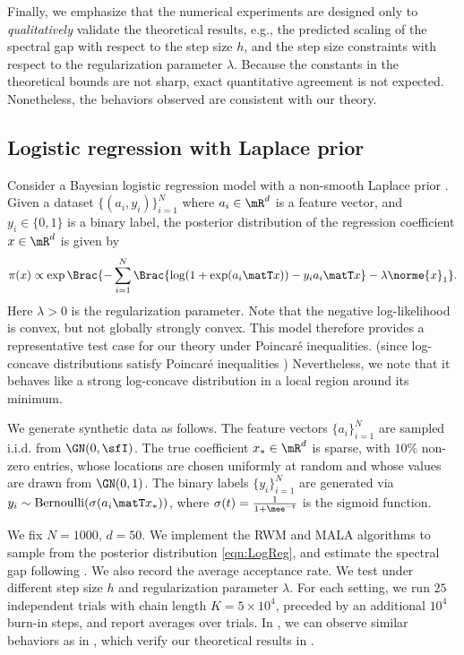 \documentclass[11pt]{article}
\begin{document}
Finally, we emphasize that the numerical experiments are designed only to \emph{qualitatively} validate the theoretical results, e.g., the predicted scaling of the spectral gap with respect to the step size $h$, and the step size constraints with respect to the regularization parameter $\lambda$.
Because the constants in the theoretical bounds are not sharp, exact quantitative agreement is not expected. Nonetheless, the behaviors observed are consistent with our theory.



\subsection{Logistic regression with Laplace prior}
\label{sec:Num_LogReg}
%
Consider a Bayesian logistic regression model with a non-smooth Laplace prior \citep{MR2227368,MR2370074}.
Given a dataset $\{(a_i,y_i)\}_{i=1}^N$ where $a_i \in \mR^d$ is a feature vector, and $y_i \in \{0,1\}$ is a binary label, the posterior distribution of the regression coefficient $x \in \mR^d$ is given by
\begin{equation}
\label{eqn:LogReg}
    \pi(x) \propto \exp \Brac{ - \sum_{i=1}^N \Brac{ \log ( 1 + \exp (a_i\matT x) ) - y_i a_i\matT x } - \lambda \norme{x}_1 }.
\end{equation}
Here $\lambda>0$ is the regularization parameter.
Note that the negative log-likelihood is convex, but not globally strongly convex. This model therefore provides a representative test case for our theory under Poincar\'e inequalities.
(since log-concave distributions satisfy Poincar\'e inequalities \citep{MR2507637})
Nevertheless, we note that it behaves like a strong log-concave distribution in a local region around its minimum.


We generate synthetic data as follows.
The feature vectors $\{a_i\}_{i=1}^N$ are sampled i.i.d. from $\GN(0,\sfI)$.
%
The true coefficient $x_* \in \mR^d$ is sparse, with $10\%$ non-zero entries, whose locations are chosen uniformly at random and whose values are drawn from $\GN(0,1)$.
%
The binary labels $\{y_i\}_{i=1}^N$ are generated via $y_i \sim \text{Bernoulli}(\sigma(a_i\matT x_*))$, where $\sigma(t) = \frac{1}{1+\mee^{-t}}$ is the sigmoid function.



We fix $N=1000$, $d=50$.
We implement the RWM and MALA algorithms to sample from the posterior distribution \eqref{eqn:LogReg}, and estimate the spectral gap following .
We also record the average acceptance rate.
We test under different step size $h$ and regularization parameter $\lambda$.
For each setting, we run $25$ independent trials with chain length $K = 5\times 10^{4}$, preceded by an additional $10^{4}$ burn-in steps, and report averages over trials.
In , we can observe similar behaviors as in , which verify our theoretical results in .
\end{document}
